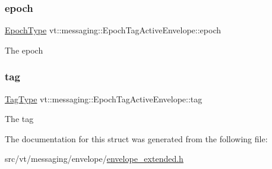 \subsubsection{\texorpdfstring{epoch}{epoch}}
{\footnotesize\ttfamily \hyperlink{namespacevt_a985a5adf291c34a3ca263b3378388236}{Epoch\+Type} vt\+::messaging\+::\+Epoch\+Tag\+Active\+Envelope\+::epoch}

The epoch \mbox{\label{structvt_1_1messaging_1_1_epoch_tag_active_envelope_aafb75781896b2eebe8cf1feae02c46f5}} 
\subsubsection{\texorpdfstring{tag}{tag}}
{\footnotesize\ttfamily \hyperlink{namespacevt_a84ab281dae04a52a4b243d6bf62d0e52}{Tag\+Type} vt\+::messaging\+::\+Epoch\+Tag\+Active\+Envelope\+::tag}

The tag 

The documentation for this struct was generated from the following file\+:\begin{DoxyCompactItemize}
\item 
src/vt/messaging/envelope/\hyperlink{envelope__extended_8h}{envelope\+\_\+extended.\+h}\end{DoxyCompactItemize}

